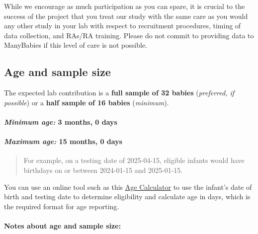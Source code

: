 \documentclass[
]{book}
\begin{document}
While we encourage as much participation as you can spare, it is crucial to the success of the project that you treat our study with the same care as you would any other study in your lab with respect to recruitment procedures, timing of data collection, and RAs/RA training. Please do not commit to providing data to ManyBabies if this level of care is not possible.

\subsection{Age and sample size}\label{age-and-sample-size}

The expected lab contribution is a \textbf{full sample of 32 babies} (\emph{preferred, if possible}) or a \textbf{half sample of 16 babies} (\emph{minimum}).

\paragraph*{\texorpdfstring{\emph{Minimum age:} 3 months, 0 days}{Minimum age: 3 months, 0 days}}\label{minimum-age-3-months-0-days}

\paragraph*{\texorpdfstring{\emph{Maximum age:} 15 months, 0 days}{Maximum age: 15 months, 0 days}}\label{maximum-age-15-months-0-days}

\begin{quote}
For example, on a testing date of 2025-04-15, eligible infants would have birthdays on or between 2024-01-15 and 2025-01-15.
\end{quote}

You can use an online tool such as this \href{https://www.calculator.net/age-calculator.html}{Age Calculator} to use the infant's date of birth and testing date to determine eligibility and calculate age in days, which is the required format for age reporting.

\paragraph*{Notes about age and sample size:}\label{notes-about-age-and-sample-size}
\end{document}

